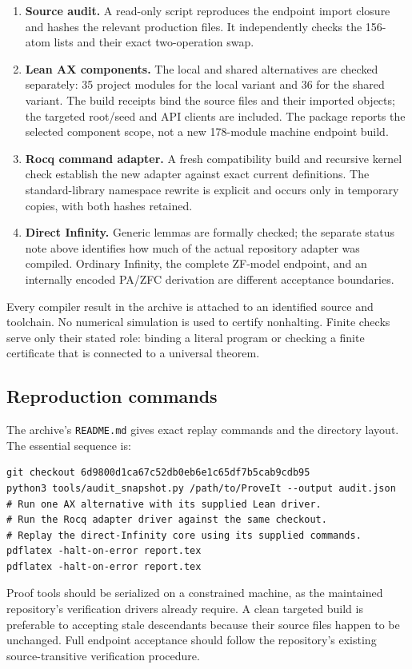 \documentclass[11pt,letterpaper]{article}
\theoremstyle{definition}\newtheorem{definition}[theorem]{Definition}
\newcommand{\code}[1]{\texttt{#1}}
\begin{document}
\begin{enumerate}
\item \textbf{Source audit.} A read-only script reproduces the endpoint import
closure and hashes the relevant production files. It independently checks the
156-atom lists and their exact two-operation swap.
\item \textbf{Lean AX components.} The local and shared alternatives are checked
separately: 35 project modules for the local variant and 36 for the shared variant.
The build receipts bind the source files and their imported objects; the targeted
root/seed and API clients are included. The package reports the
selected component scope, not a new 178-module machine endpoint build.
\item \textbf{Rocq command adapter.} A fresh compatibility build and recursive
kernel check establish the new adapter against exact current definitions.
The standard-library namespace rewrite is explicit and occurs only in temporary
copies, with both hashes retained.
\item \textbf{Direct Infinity.} Generic lemmas are formally checked; the separate
status note above identifies how much of the actual repository adapter was
compiled. Ordinary Infinity, the complete ZF-model endpoint, and an internally
encoded PA/ZFC derivation are different acceptance boundaries.
\end{enumerate}

Every compiler result in the archive is attached to an identified source and
toolchain. No numerical simulation is used to certify nonhalting. Finite checks
serve only their stated role: binding a literal program or checking a finite
certificate that is connected to a universal theorem.

\subsection{Reproduction commands}

The archive's \code{README.md} gives exact replay commands and the directory
layout. The essential sequence is:
\begin{lstlisting}
git checkout 6d9800d1ca67c52db0eb6e1c65df7b5cab9cdb95
python3 tools/audit_snapshot.py /path/to/ProveIt --output audit.json
# Run one AX alternative with its supplied Lean driver.
# Run the Rocq adapter driver against the same checkout.
# Replay the direct-Infinity core using its supplied commands.
pdflatex -halt-on-error report.tex
pdflatex -halt-on-error report.tex
\end{lstlisting}
Proof tools should be serialized on a constrained machine, as the maintained
repository's verification drivers already require. A clean targeted build is
preferable to accepting stale descendants because their source files happen to
be unchanged. Full endpoint acceptance should follow the repository's existing
source-transitive verification procedure.
\end{document}
